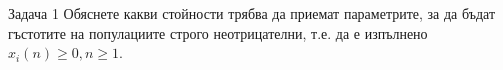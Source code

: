 \begin{frame}[t]{Задача 1}
  Обяснете какви стойности трябва да приемат параметрите, за да бъдат гъстотите на популациите строго неотрицателни, т.е. да е изпълнено $x_{i}(n) \geq 0, n \geq 1$.
\end{frame}

